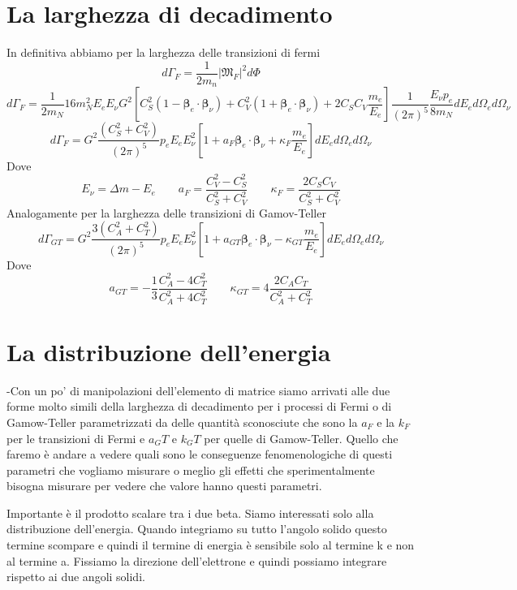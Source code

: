 \section{La larghezza di decadimento}
In definitiva abbiamo per la larghezza delle transizioni di fermi
$$
d\Gamma_F = \frac{1}{2m_n} |\mathfrak{M}_F|^2 d\Phi
$$
$$
d\Gamma_F = \frac{1}{2m_N} 16m_N^2 E_e E_\nu G^2 \left[ C_S^2 (1 - \boldsymbol{\beta}_e \cdot \boldsymbol{\beta}_\nu) + C_V^2 (1 + \boldsymbol{\beta}_e \cdot \boldsymbol{\beta}_\nu) + 2C_S C_V \frac{m_e}{E_e} \right] \frac{1}{(2\pi)^5} \frac{E_\nu p_e}{8m_N} dE_e d\Omega_e d\Omega_\nu
$$
$$
d\Gamma_F = G^2 \frac{(C_S^2 + C_V^2)}{(2\pi)^5} p_e E_e E_\nu^2 \left[ 1 + a_F \boldsymbol{\beta}_e \cdot \boldsymbol{\beta}_\nu + \kappa_F \frac{m_e}{E_e} \right] dE_e d\Omega_e d\Omega_\nu
$$
Dove
$$
E_\nu = \Delta m - E_e \qquad a_F = \frac{C_V^2 - C_S^2}{C_S^2 + C_V^2} \qquad \kappa_F = \frac{2C_S C_V}{C_S^2 + C_V^2}
$$
Analogamente per la larghezza delle transizioni di Gamov-Teller
$$
d\Gamma_{GT} = G^2 \frac{3(C_A^2 + C_T^2)}{(2\pi)^5} p_e E_e E_\nu^2 \left[ 1 + a_{GT} \boldsymbol{\beta}_e \cdot \boldsymbol{\beta}_\nu - \kappa_{GT} \frac{m_e}{E_e} \right] dE_e d\Omega_e d\Omega_\nu
$$
Dove
$$
a_{GT} = -\frac{1}{3} \frac{C_A^2 - 4C_T^2}{C_A^2 + 4C_T^2} \qquad \kappa_{GT} = 4 \frac{2C_A C_T}{C_A^2 + C_T^2}
$$
\section{La distribuzione dell'energia}
-Con un po' di manipolazioni dell'elemento di matrice siamo arrivati alle due forme molto simili della larghezza di decadimento per i processi di Fermi o di Gamow-Teller parametrizzati da delle quantità sconosciute che sono la $a_F$ e la $k_F$ per le transizioni di Fermi e $a_GT$ e $k_GT$ per quelle di Gamow-Teller. Quello che faremo è andare a vedere quali sono le conseguenze fenomenologiche di questi parametri che vogliamo misurare o meglio gli effetti che sperimentalmente bisogna misurare per vedere che valore hanno questi parametri.

Importante è il prodotto scalare tra i due beta. Siamo interessati solo alla distribuzione dell'energia. Quando integriamo su tutto l'angolo solido questo termine scompare e quindi il termine di energia è sensibile solo al termine k e non al termine a. Fissiamo la direzione dell'elettrone e quindi possiamo integrare rispetto ai due angoli solidi.

